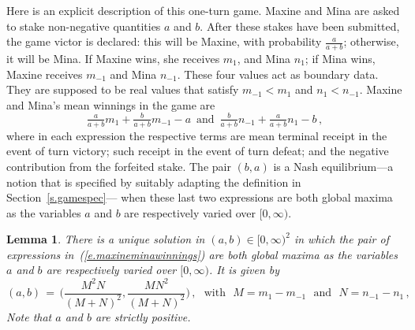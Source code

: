 \documentclass[letterpaper,11pt,oneside,reqno]{amsbook}
\numberwithin{figure}{chapter}
\newtheorem{lemma}[theorem]{Lemma}
\theoremstyle{definition}
\theoremstyle{definition}
\theoremstyle{definition}
\theoremstyle{definition}
\theoremstyle{definition}
\begin{document}
Here is an explicit description of this one-turn game.
Maxine and Mina are asked to stake non-negative quantities $a$ and $b$. After these stakes have been submitted, the game victor is declared: this will be Maxine, with probability $\tfrac{a}{a+b}$; otherwise, it will be Mina. If Maxine wins, she receives $m_1$, and Mina $n_1$; if Mina wins, Maxine receives $m_{-1}$ and Mina $n_{-1}$. These four values act as boundary data. They are supposed to be real values that satisfy $m_{-1} < m_1$ and  $n_1 < n_{-1}$.
%
Maxine and Mina's mean winnings in the game are 
\begin{equation}\label{e.maxineminawinnings}
\tfrac{a}{a+b} m_1 + \tfrac{b}{a+b} m_{-1}  -a  \, \, \, \textrm{and} \, \, \,  \tfrac{b}{a+b} n_{-1} + \tfrac{a}{a+b} n_1  - b \, ,
\end{equation}
where in each expression the respective terms are mean terminal receipt in the event of turn victory; such receipt in the event of turn defeat; and the negative contribution from the forfeited stake. 
The pair $(b,a)$ is a Nash equilibrium---a notion that is specified by suitably adapting the definition in Section~\ref{s.gamespec}---%
when these last two expressions are both global maxima as the variables $a$ and $b$ are respectively varied over $[0,\infty)$.
\begin{lemma}\label{l.pennyforfeit}
There is a unique solution in $(a,b) \in [0,\infty)^2$ in which the pair of expressions in~(\ref{e.maxineminawinnings}) are both global maxima as the variables $a$ and $b$ are respectively varied over $[0,\infty)$. It is given by 
\begin{equation}\label{e.absolution}
(a,b) \, = \, \bigg(\frac{M^2 N}{(M+N)^2},\frac{M N^2}{(M+N)^2} \bigg) \, , \, \, \, \, \textrm{with} \, \, \, \, M = m_1 - m_{-1} \, \, \, \, \textrm{and} \, \, \, \, N = n_{-1} - n_1 \, ,
\end{equation}
Note that $a$ and $b$ are strictly positive.
\end{lemma}
\end{document}
